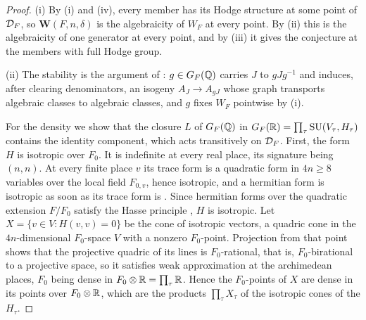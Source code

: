 \begin{proof}
(i) By (i) and (iv), every member has its Hodge structure
at some point of $\mathcal{D}_{F}$, so $\mathbf{W}(F,n,\delta)$ is the algebraicity of
$W_{F}$ at every point. By (ii) this is the algebraicity of
one generator at every point, and by (iii) it gives the
conjecture at the members with full Hodge group.

(ii) The stability is the argument of : $g\in G_{F}(\mathbb{Q})$
carries $J$ to $gJg^{-1}$ and induces, after clearing denominators, an isogeny
$A_{J}\to A_{gJ}$ whose graph transports algebraic classes to algebraic
classes, and $g$ fixes $W_{F}$ pointwise by (i).

For the density we show that the closure $L$ of $G_{F}(\mathbb{Q})$ in
$G_{F}(\mathbb{R})=\prod_{\tau}\operatorname{SU}(V_{\tau},H_{\tau})$ contains the identity
component, which acts transitively on $\mathcal{D}_{F}$. First, the form $H$ is
isotropic over $F_{0}$. It is indefinite at every real place, its signature
being $(n,n)$. At every finite place $v$ its trace form is a quadratic form
in $4n\ge8$ variables over the local field $F_{0,v}$, hence isotropic, and a
hermitian form is isotropic as soon as its trace form is
\cite[Ch.~10, \S1]{Sch85}. Since hermitian forms over the quadratic
extension $F/F_{0}$ satisfy the Hasse principle \cite[Ch.~10, \S6]{Sch85},
$H$ is isotropic. Let $X=\{v\in V:H(v,v)=0\}$ be the cone of isotropic
vectors, a quadric cone in the $4n$-dimensional $F_{0}$-space $V$ with a
nonzero $F_{0}$-point. Projection from that point shows that the projective
quadric of its lines is $F_{0}$-rational, that is, $F_{0}$-birational to a
projective space, so it satisfies weak approximation at the archimedean
places, $F_{0}$ being dense in $F_{0}\otimes\mathbb{R}=\prod_{\tau}\mathbb{R}$. Hence the
$F_{0}$-points of $X$ are dense in its points over $F_{0}\otimes\mathbb{R}$, which
are the products $\prod_{\tau}X_{\tau}$ of the isotropic cones of the
$H_{\tau}$.


\end{proof}
